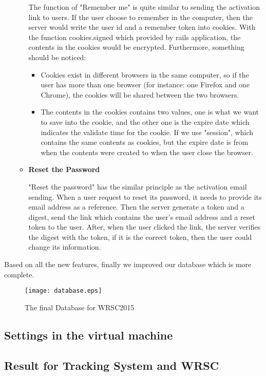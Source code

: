 \begin{enumerate}
\begin{itemize}
The function of "Remember me" is quite similar to sending the activation link to users. If the user choose to remember in the computer, then the server would write the user id and a remember token into cookies. With the function cookies.signed which provided by rails application, the contents in the cookies would be encrypted. Furthermore, something should be noticed: 
\begin{itemize}
\item Cookies exist in different browsers in the same computer, so if the user has more than one browser (for instance: one Firefox and one Chrome), the cookies will be shared between the two browsers. 
\item The contents in the cookies contains two values, one is what we want to save into the cookie, and the other one is the expire date which indicates the validate time for the cookie. If we use "session", which contains the same contents as cookies, but the expire date is from when the contents were created to when the user close the browser.
\end{itemize} 

\item{\textbf{Reset the Password}}


"Reset the password" has the similar principle as the activation email sending. When a user request to reset its password, it needs to provide its email address as a reference. Then the server generate a token and a digest, send the link which contains the user's email address and a reset token to the user. After, when the user clicked the link, the server verifies the digest with the token, if it is the correct token, then the user could change its information.
\end{itemize}

\end{enumerate}





Based on all the new features, finally we improved our database which is more complete.
\begin{figure}[h!]
\centering
\texttt{[image: database.eps]}
\caption{The final Database for WRSC2015}
\label{fig-sample}
\end{figure}
\subsection{Settings in the virtual machine}

\subsection{Result for Tracking System and WRSC}
